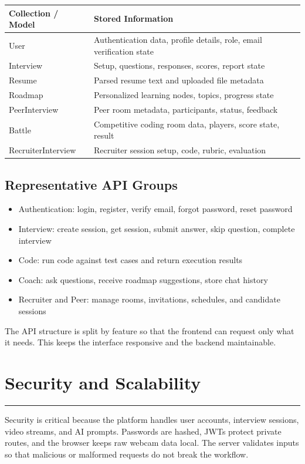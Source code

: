 ﻿\documentclass[12pt,a4paper]{article}
\newcommand{\sectionline}{\vspace{0.4em}\hrule\vspace{0.8em}}
\begin{document}
\begin{table}[H]
\centering
\renewcommand{\arraystretch}{1.25}
\begin{tabularx}{\textwidth}{>{\raggedright\arraybackslash}p{3.8cm} >{\raggedright\arraybackslash}X}
\toprule
\rowcolor{SoftBlue}
\textbf{Collection / Model} & \textbf{Stored Information} \\
\midrule
User & Authentication data, profile details, role, email verification state \\
Interview & Setup, questions, responses, scores, report state \\
Resume & Parsed resume text and uploaded file metadata \\
Roadmap & Personalized learning nodes, topics, progress state \\
PeerInterview & Peer room metadata, participants, status, feedback \\
Battle & Competitive coding room data, players, score state, result \\
RecruiterInterview & Recruiter session setup, code, rubric, evaluation \\
\bottomrule
\end{tabularx}
\end{table}

\subsection{Representative API Groups}
\begin{itemize}
  \item Authentication: login, register, verify email, forgot password, reset password
  \item Interview: create session, get session, submit answer, skip question, complete interview
  \item Code: run code against test cases and return execution results
  \item Coach: ask questions, receive roadmap suggestions, store chat history
  \item Recruiter and Peer: manage rooms, invitations, schedules, and candidate sessions
\end{itemize}

The API structure is split by feature so that the frontend can request only what it needs. This keeps the interface responsive and the backend maintainable.

\clearpage

\section{Security and Scalability}
\sectionline
Security is critical because the platform handles user accounts, interview sessions, video streams, and AI prompts. Passwords are hashed, JWTs protect private routes, and the browser keeps raw webcam data local. The server validates inputs so that malicious or malformed requests do not break the workflow.
\end{document}
